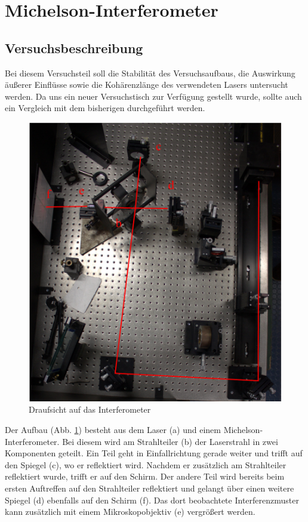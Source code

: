 \section{Michelson-Interferometer}
\subsection{Versuchsbeschreibung}

Bei diesem Versuchsteil soll die Stabilität des Versuchsaufbaus, die Auswirkung äußerer Einflüsse sowie die Kohärenzlänge des verwendeten Lasers untersucht werden. Da uns ein neuer Versuchstisch zur Verfügung gestellt wurde, sollte auch ein Vergleich mit dem bisherigen durchgeführt werden.


\begin{figure}[ht]
 \includegraphics[width=\textwidth]{BilderAufbau/Michelson.pdf}
 \caption{Draufsicht auf das Interferometer}
 \label{aufbau_interferometer}
\end{figure}

Der Aufbau (Abb. \ref{aufbau_interferometer}) besteht aus dem Laser (a) und einem Michelson-Interferometer. Bei diesem wird am Strahlteiler (b) der Laserstrahl in zwei Komponenten geteilt. Ein Teil geht in Einfallrichtung gerade weiter und trifft auf den Spiegel (c), wo er reflektiert wird. Nachdem er zusätzlich am Strahlteiler reflektiert wurde, trifft er auf den Schirm. Der andere Teil wird bereits beim ersten Auftreffen auf den Strahlteiler reflektiert und gelangt über einen weitere Spiegel (d) ebenfalls auf den Schirm (f). Das dort beobachtete Interferenzmuster kann zusätzlich mit einem Mikroskopobjektiv (e) vergrößert werden.  

